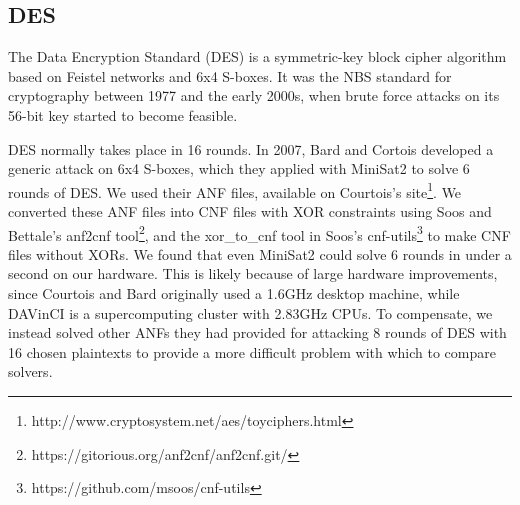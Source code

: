 \subsection{DES}
\label{sec:encoding:des}

The Data Encryption Standard (DES) is a symmetric-key block cipher algorithm based on Feistel networks and 6x4 S-boxes. It was the NBS standard for cryptography between 1977 and the early 2000s, when brute force attacks on its 56-bit key started to become feasible.\cite{Simmons16}

DES normally takes place in 16 rounds. In 2007, Bard and Cortois\cite{CB07} developed a generic attack on 6x4 S-boxes, which they applied with MiniSat2 to solve 6 rounds of DES.  We used their ANF files, available on Courtois's site\footnote{http://www.cryptosystem.net/aes/toyciphers.html}. We converted these ANF files into CNF files with XOR constraints using Soos and Bettale's anf2cnf tool\footnote{https://gitorious.org/anf2cnf/anf2cnf.git/}, and the xor\_to\_cnf tool in Soos's cnf-utils\footnote{https://github.com/msoos/cnf-utils} to make CNF files without XORs. We found that even MiniSat2 could solve 6 rounds in under a second on our hardware. This is likely because of large hardware improvements, since Courtois and Bard originally used a 1.6GHz desktop machine, while DAVinCI is a supercomputing cluster with 2.83GHz CPUs. To compensate, we instead solved other ANFs they had provided for attacking 8 rounds of DES with 16 chosen plaintexts to provide a more difficult problem with which to compare solvers.
